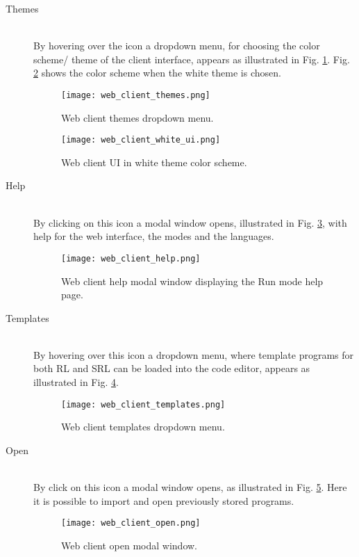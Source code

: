 \begin{description}

  \item[ Themes]~\\
    By hovering over the icon a dropdown menu, for choosing the color scheme/ theme of the client interface, appears as illustrated in Fig. \ref{fig:web_client_themes}.
    Fig. \ref{fig:web_client_white_ui} shows the color scheme when the white theme is chosen.
    \begin{figure}
      \texttt{[image: web\_client\_themes.png]}
      \caption{Web client themes dropdown menu.}
      \label{fig:web_client_themes}
    \end{figure}
    \begin{figure}
      \texttt{[image: web\_client\_white\_ui.png]}
      \caption{Web client UI in white theme color scheme.}
      \label{fig:web_client_white_ui}
    \end{figure}

  \item[ Help]~\\
    By clicking on this icon a modal window opens, illustrated in Fig. \ref{fig:web_client_help}, with help for the web interface, the modes and the languages.
    \begin{figure}
      \texttt{[image: web\_client\_help.png]}
      \caption{Web client help modal window displaying the Run mode help page.}
      \label{fig:web_client_help}
    \end{figure}

  \item[ Templates]~\\
    By hovering over this icon a dropdown menu, where template programs for both RL and SRL can be loaded into the code editor, appears as illustrated in Fig. \ref{fig:web_client_templates}.
    \begin{figure}
      \texttt{[image: web\_client\_templates.png]}
      \caption{Web client templates dropdown menu.}
      \label{fig:web_client_templates}
    \end{figure}

  \item[ Open]~\\
    By click on this icon a modal window opens, as illustrated in Fig. \ref{fig:web_client_open}. Here it is possible to import and open previously stored programs.
    \begin{figure}
      \texttt{[image: web\_client\_open.png]}
      \caption{Web client open modal window.}
      \label{fig:web_client_open}
    \end{figure}


\end{description}
